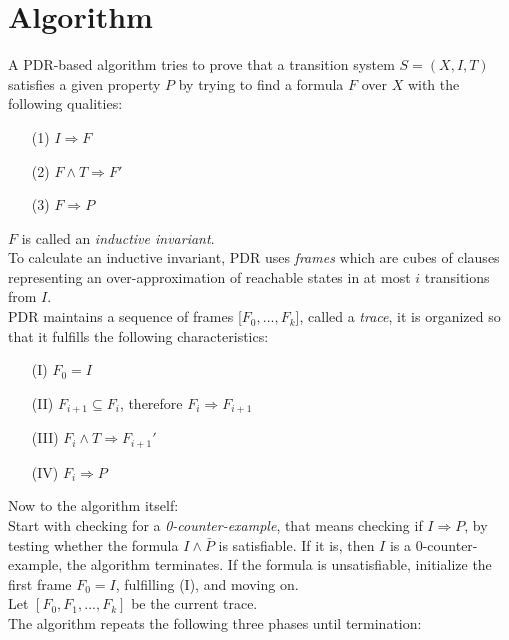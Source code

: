 \documentclass[11pt, a4paper, BCOR=10mm, ngerman, oneside]{scrbook}
\begin{document}
\section{Algorithm}
A PDR-based algorithm tries to prove that a transition system $S = (X, I, T)$ satisfies a given property $P$ by trying to find a formula $F$ over $X$ with the following qualities:
\begin{itemize}
\item[(1)] $I \Rightarrow F$
\item[(2)] $F \land T \Rightarrow F'$
\item[(3)] $F \Rightarrow P$
\end{itemize}
$F$ is called an \textsl{inductive invariant}. \\ 
To calculate an inductive invariant, PDR uses \textsl{frames} which are cubes of clauses representing an over-approximation of reachable states in at most $i$ transitions from $I$. \\
PDR maintains a sequence of frames [$F_0, ..., F_k$], called a \textsl{trace}, it is organized so that it fulfills the following characteristics: 

\begin{itemize}
\item[(I)] $F_0 = I$
\item[(II)] $F_{i+1} \subseteq F_{i}$, therefore $F_i \Rightarrow F_{i+1}$
\item[(III)] $F_i \land T \Rightarrow F_{i+1}'$
\item[(IV)] $F_i \Rightarrow P$
\end{itemize}

Now to the algorithm itself: \\
Start with checking for a \textsl{0-counter-example}, that means checking if $I \Rightarrow P$, by testing whether the formula $I \land \bar P$ is satisfiable. If it is, then $I$ is a 0-counter-example, the algorithm terminates.
If the formula is unsatisfiable, initialize the first frame $F_0 = I$, fulfilling (I), and moving on. \\

Let $[F_0, F_1, ..., F_k]$ be the current trace. \\ 
The algorithm repeats the following three phases until termination: \par
\end{document}

